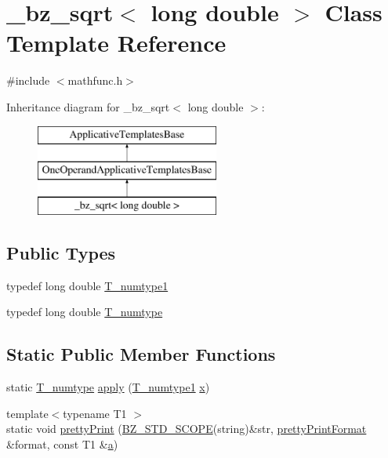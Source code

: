 \hypertarget{class__bz__sqrt_3_01long_01double_01_4}{}\section{\+\_\+bz\+\_\+sqrt$<$ long double $>$ Class Template Reference}
\label{class__bz__sqrt_3_01long_01double_01_4}


{\ttfamily \#include $<$mathfunc.\+h$>$}

Inheritance diagram for \+\_\+bz\+\_\+sqrt$<$ long double $>$\+:\begin{figure}[H]
\begin{center}
\leavevmode
\includegraphics[height=3.000000cm]{class__bz__sqrt_3_01long_01double_01_4}
\end{center}
\end{figure}
\subsection*{Public Types}
\begin{DoxyCompactItemize}
\item 
typedef long double \hyperlink{class__bz__sqrt_3_01long_01double_01_4_a8447a9b2c6d66d6e783e95aa759ce0c4}{T\+\_\+numtype1}
\item 
typedef long double \hyperlink{class__bz__sqrt_3_01long_01double_01_4_aeffaa5647d24c6a707d51f088b4d266e}{T\+\_\+numtype}
\end{DoxyCompactItemize}
\subsection*{Static Public Member Functions}
\begin{DoxyCompactItemize}
\item 
static \hyperlink{class__bz__sqrt_3_01long_01double_01_4_aeffaa5647d24c6a707d51f088b4d266e}{T\+\_\+numtype} \hyperlink{class__bz__sqrt_3_01long_01double_01_4_ab943f5372bed3d8d0b820927539064a2}{apply} (\hyperlink{class__bz__sqrt_3_01long_01double_01_4_a8447a9b2c6d66d6e783e95aa759ce0c4}{T\+\_\+numtype1} \hyperlink{vecnorm1_8cc_ac73eed9e41ec09d58f112f06c2d6cb63}{x})
\item 
{\footnotesize template$<$typename T1 $>$ }\\static void \hyperlink{class__bz__sqrt_3_01long_01double_01_4_aae377b168dc22c9b109230403606ed3c}{pretty\+Print} (\hyperlink{numinquire_8h_a2b24ffc3b4ef9803956bc7715c6c7b83}{B\+Z\+\_\+\+S\+T\+D\+\_\+\+S\+C\+O\+P\+E}(string)\&str, \hyperlink{classprettyPrintFormat}{pretty\+Print\+Format} \&format, const T1 \&\hyperlink{gen__mat5files_8m_aae328bf20413f220e38aec4d95bfd6da}{a})
\end{DoxyCompactItemize}


